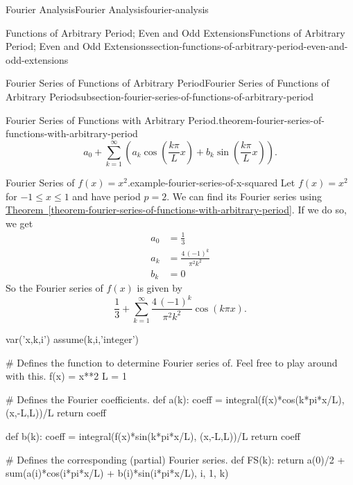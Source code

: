 \documentclass[oneside,10pt,]{book}
\numberwithin{equation}{section}
\newcommand{\amp}{&}
\begin{document}
\begin{chapterptx}{Fourier Analysis}{}{Fourier Analysis}{}{}{fourier-analysis}
\begin{sectionptx}{Functions of Arbitrary Period; Even and Odd Extensions}{}{Functions of Arbitrary Period; Even and Odd Extensions}{}{}{section-functions-of-arbitrary-period-even-and-odd-extensions}
\begin{subsectionptx}{Fourier Series of Functions of Arbitrary Period}{}{Fourier Series of Functions of Arbitrary Period}{}{}{subsection-fourier-series-of-functions-of-arbitrary-period}
\begin{theorem}{Fourier Series of Functions with Arbitrary Period.}{}{theorem-fourier-series-of-functions-with-arbitrary-period}
\begin{equation*}
a_{0}+\sum_{k=1}^{\infty}\left(a_{k}\cos\left(\frac{k\pi}{L}x\right)+b_{k}\sin\left(\frac{k\pi}{L}x\right)\right).
\end{equation*}
%
\end{theorem}
\begin{example}{Fourier Series of \(f(x) = x^{2}\).}{example-fourier-series-of-x-squared}%
\hypertarget{p-591}{}%
Let \(f(x) = x^{2}\) for \(-1\leq x\leq 1\) and have period \(p=2\). We can find its Fourier series using \hyperref[theorem-fourier-series-of-functions-with-arbitrary-period]{Theorem~\ref{theorem-fourier-series-of-functions-with-arbitrary-period}}. If we do so, we get%
\begin{align*}
a_{0} \amp= \frac{1}{3}\\
a_{k} \amp= \frac{4 \, \left(-1\right)^{k}}{\pi^{2} k^{2}}\\
b_{k} \amp= 0
\end{align*}
So the Fourier series of \(f(x)\) is given by%
\begin{equation*}
\frac{1}{3} + \sum_{k=1}^{\infty}\frac{4 \, \left(-1\right)^{k}}{\pi^{2} k^{2}}\cos\left(k\pi x\right)\text{.}
\end{equation*}
%
\end{example}
\begin{sageinput}
var('x,k,i')
assume(k,i,'integer')

# Defines the function to determine Fourier series of. Feel free to play around with this.
f(x) = x**2
L = 1

# Defines the Fourier coefficients.
def a(k):
  coeff = integral(f(x)*cos(k*pi*x/L), (x,-L,L))/L
  return coeff

def b(k):
  coeff = integral(f(x)*sin(k*pi*x/L), (x,-L,L))/L
  return coeff

# Defines the corresponding (partial) Fourier series.
def FS(k):
  return a(0)/2 + sum(a(i)*cos(i*pi*x/L) + b(i)*sin(i*pi*x/L), i, 1, k)


\end{sageinput}
\end{subsectionptx}
\end{sectionptx}
\end{chapterptx}
\end{document}
